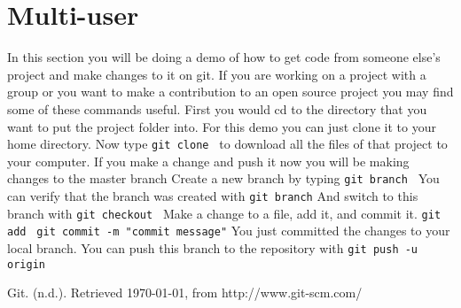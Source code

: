 \documentclass[11pt]{report}
\begin{document}
\chapter{Multi-user}
In this section you will be doing a demo of how to get code from
someone else's project and make changes to it on git. If you are
working on a project with a group or you want to make a contribution
to an open source project you may find some of these commands useful.
First you would cd to the directory that you want to put the project
folder into.  For this demo you can just clone it to your home
directory.  Now type \texttt{git clone }
to download all the files of that project to your computer.  If you
make a change and push it now you will be making changes to the master
branch Create a new branch by typing \texttt{git branch
  } You can verify that
the branch was created with \texttt{git branch} And switch to this
branch with \texttt{git checkout
  } Make a change to a
file, add it, and commit it.  \texttt{git add
  } \texttt{git commit -m "commit message"}
You just committed the changes to your local branch.  You can push
this branch to the repository with \texttt{git push -u origin
  }


\begin{thebibliography}{9}

    Git. (n.d.). Retrieved \today, from http://www.git-scm.com/

\end{thebibliography}
\end{document}
